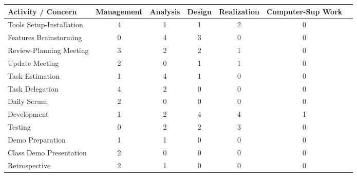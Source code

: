 \resizebox{16cm}{!} {
		\begin{tabular}{l || c|c|c|c|c|c}
			Activity / Concern & Management & Analysis  & Design & Realization & Computer-Sup Work \\
			\hline \hline 
			Tools Setup-Installation	&4	&1	&1	&2	&0 	\\ 
			Features Brainstorming		&0	&4	&3	&0	&0	\\
			Review-Planning Meeting 	&3	&2	&2	&1	&0	\\
			Update  Meeting				&2	&0	&1	&1	&0	\\
			Task Estimation				&1	&4	&1	&0	&0	\\
			Task Delegation				&4	&2	&0	&0	&0	\\
			Daily Scrum					&2	&0	&0	&0	&0	\\
			Development					&1	&2	&4	&4	&1	\\
			Testing						&0	&2	&2	&3	&0	\\
			Demo Preparation			&1	&1	&0	&0	&0	\\
			Class Demo Presentation		&2	&0	&0	&0	&0	\\
			Retrospective				&2	&1	&0	&0	&0	\\
		\end{tabular}
}


